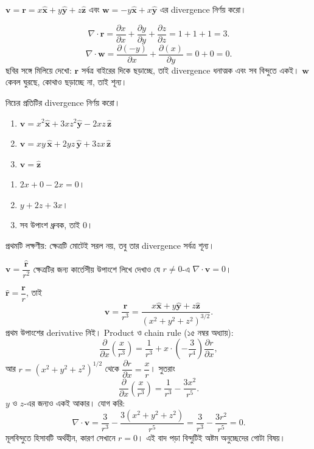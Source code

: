 \documentclass[11pt]{article}
\begin{document}
\begin{example}
$\mathbf{v} = \mathbf{r} = x\hat{\mathbf{x}}+y\hat{\mathbf{y}}
+z\hat{\mathbf{z}}$ এবং $\mathbf{w} = -y\hat{\mathbf{x}}+x\hat{\mathbf{y}}$
এর divergence নির্ণয় করো।
\end{example}

\begin{solbox}
\[
  \nabla\cdot\mathbf{r} = \frac{\partial x}{\partial x}
  + \frac{\partial y}{\partial y} + \frac{\partial z}{\partial z}
  = 1+1+1 = 3 .
\]
\[
  \nabla\cdot\mathbf{w} = \frac{\partial(-y)}{\partial x}
  + \frac{\partial(x)}{\partial y} = 0 + 0 = 0 .
\]
ছবির সঙ্গে মিলিয়ে দেখো: $\mathbf{r}$ সর্বত্র বাইরের দিকে ছড়াচ্ছে, তাই
divergence ধনাত্মক এবং সব বিন্দুতে একই। $\mathbf{w}$ কেবল ঘুরছে, কোথাও
ছড়াচ্ছে না, তাই শূন্য।
\end{solbox}

 নিচের প্রতিটির divergence নির্ণয় করো।
\begin{enumerate}
  \item $\mathbf{v} = x^{2}\hat{\mathbf{x}} + 3xz^{2}\hat{\mathbf{y}}
        - 2xz\,\hat{\mathbf{z}}$
  \item $\mathbf{v} = xy\,\hat{\mathbf{x}} + 2yz\,\hat{\mathbf{y}}
        + 3zx\,\hat{\mathbf{z}}$
  \item $\mathbf{v} = \hat{\mathbf{z}}$
\end{enumerate}

\begin{sol}
\begin{enumerate}
  \item $2x + 0 - 2x = 0$।
  \item $y + 2z + 3x$।
  \item সব উপাংশ ধ্রুবক, তাই $0$।
\end{enumerate}
প্রথমটি লক্ষণীয়: ক্ষেত্রটি মোটেই সরল নয়, তবু তার divergence সর্বত্র শূন্য।
\end{sol}

 $\mathbf{v} = \dfrac{\hat{\mathbf{r}}}{r^{2}}$ ক্ষেত্রটির জন্য
কার্তেসীয় উপাংশে লিখে দেখাও যে $r \neq 0$-এ $\nabla\cdot\mathbf{v} = 0$।

\begin{sol}
$\hat{\mathbf{r}} = \dfrac{\mathbf{r}}{r}$, তাই
\[
  \mathbf{v} = \frac{\mathbf{r}}{r^{3}}
  = \frac{x\hat{\mathbf{x}}+y\hat{\mathbf{y}}+z\hat{\mathbf{z}}}
  {\left( x^{2}+y^{2}+z^{2} \right)^{3/2}} .
\]
প্রথম উপাংশের derivative নিই। Product ও chain rule (১৫ নম্বর অধ্যায়):
\[
  \frac{\partial}{\partial x}\left( \frac{x}{r^{3}} \right)
  = \frac{1}{r^{3}} + x \cdot \left( -\frac{3}{r^{4}} \right)
    \frac{\partial r}{\partial x} ,
\]
আর $r = \left( x^{2}+y^{2}+z^{2} \right)^{1/2}$ থেকে
$\dfrac{\partial r}{\partial x} = \dfrac{x}{r}$। সুতরাং
\[
  \frac{\partial}{\partial x}\left( \frac{x}{r^{3}} \right)
  = \frac{1}{r^{3}} - \frac{3x^{2}}{r^{5}} .
\]
$y$ ও $z$-এর জন্যও একই আকার। যোগ করি:
\[
  \nabla\cdot\mathbf{v} = \frac{3}{r^{3}}
  - \frac{3\left( x^{2}+y^{2}+z^{2} \right)}{r^{5}}
  = \frac{3}{r^{3}} - \frac{3r^{2}}{r^{5}} = 0 .
\]
মূলবিন্দুতে হিসাবটি অর্থহীন, কারণ সেখানে $r = 0$। এই বাদ পড়া বিন্দুটিই অষ্টম
অনুচ্ছেদের গোটা বিষয়।
\end{sol}
\end{document}
